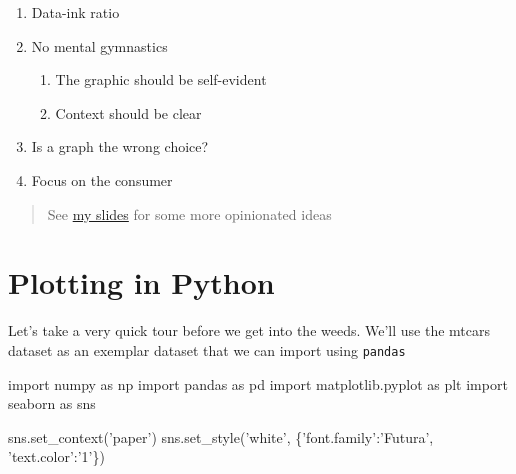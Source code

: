 \documentclass[
  letterpaper,
]{scrbook}
\newenvironment{Shaded}{\begin{snugshade}}{\end{snugshade}}
\newcommand{\ImportTok}[1]{#1}
\newcommand{\NormalTok}[1]{#1}
\newcommand{\StringTok}[1]{\textcolor[rgb]{0.31,0.60,0.02}{#1}}
\providecommand{\tightlist}{%
  \setlength{\itemsep}{0pt}\setlength{\parskip}{0pt}}
\begin{document}
\begin{enumerate}
\def\labelenumi{\arabic{enumi}.}
\tightlist
\item
  Data-ink ratio
\item
  No mental gymnastics

  \begin{enumerate}
  \def\labelenumii{\arabic{enumii}.}
  \tightlist
  \item
    The graphic should be self-evident
  \item
    Context should be clear
  \end{enumerate}
\item
  Is a graph the wrong choice?
\item
  Focus on the consumer
\end{enumerate}

\begin{quote}
See \href{http://araastat.com/BIOF439/slides/lectures/01-DataViz.pdf}{my slides} for some more opinionated ideas
\end{quote}

\hypertarget{plotting-in-python}{%
\section{Plotting in Python}\label{plotting-in-python}}

Let's take a very quick tour before we get into the weeds. We'll use the mtcars dataset as an exemplar dataset that we can import using \texttt{pandas}

\begin{Shaded}
\begin{Highlighting}[]
\ImportTok{import}\NormalTok{ numpy }\ImportTok{as}\NormalTok{ np}
\ImportTok{import}\NormalTok{ pandas }\ImportTok{as}\NormalTok{ pd}
\ImportTok{import}\NormalTok{ matplotlib.pyplot }\ImportTok{as}\NormalTok{ plt}
\ImportTok{import}\NormalTok{ seaborn }\ImportTok{as}\NormalTok{ sns}
\end{Highlighting}
\end{Shaded}

\begin{Shaded}
\begin{Highlighting}[]
\NormalTok{sns.set_context(}\StringTok{'paper'}\NormalTok{)}
\NormalTok{sns.set_style(}\StringTok{'white'}\NormalTok{, \{}\StringTok{'font.family'}\NormalTok{:}\StringTok{'Futura'}\NormalTok{, }\StringTok{'text.color'}\NormalTok{:}\StringTok{'1'}\NormalTok{\})}
\end{Highlighting}
\end{Shaded}
\end{document}

